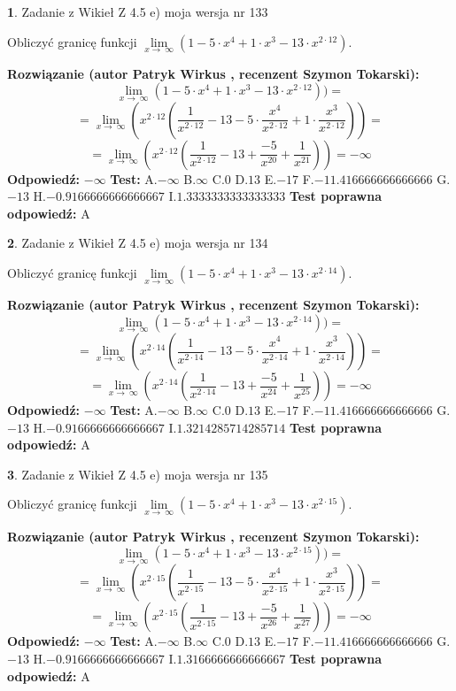 \documentclass[12pt, a4paper]{article}
\theoremstyle{definition} %
\newtheorem{zad}{}
\newcommand{\zadStart}[1]{\begin{zad}#1\newline}
\newcommand{\zadStop}{\end{zad}}
\newcommand{\rozwStart}[2]{\noindent \textbf{Rozwiązanie (autor #1 , recenzent #2): }\newline}
\newcommand{\rozwStop}{\newline}
\newcommand{\odpStart}{\noindent \textbf{Odpowiedź:}\newline}
\newcommand{\odpStop}{\newline}
\newcommand{\testStart}{\noindent \textbf{Test:}\newline}
\newcommand{\testStop}{\newline}
\newcommand{\kluczStart}{\noindent \textbf{Test poprawna odpowiedź:}\newline}
\newcommand{\kluczStop}{\newline}
\begin{document}
\zadStart{Zadanie z Wikieł Z 4.5 e) moja wersja nr 133}


Obliczyć granicę funkcji  $\lim\limits_{x\to\ \infty}(1 - 5 \cdot x^{4}+1 \cdot x^{3}- 13 \cdot x^{2\cdot12})$.
\zadStop
\rozwStart{Patryk Wirkus}{Szymon Tokarski}
$$\lim\limits_{x\to\ \infty}(1 - 5 \cdot x^{4}+1 \cdot x^{3}- 13 \cdot x^{2\cdot12}))=$$
$$=\lim\limits_{x\to\ \infty}(x^{2\cdot12}(\frac{1}{x^{2\cdot12}}-13 -5 \cdot \frac{x^{4}}{x^{2\cdot12}}+1 \cdot \frac{x^{3}}{x^{2\cdot12}}))=$$
$$=\lim\limits_{x\to\ \infty}(x^{2\cdot12}(\frac{1}{x^{2\cdot12}}-13 + \frac{-5}{x^{20}}+ \frac{1}{x^{21}}))=-\infty$$
\rozwStop
\odpStart
$-\infty$
\odpStop
\testStart
A.$-\infty$ B.$\infty$ C.$0$ D.$13$ E.$-17$
F.$-11.416666666666666$ G.$-13$
H.$-0.9166666666666667$
I.$1.3333333333333333$
\testStop
\kluczStart
A
\kluczStop



\zadStart{Zadanie z Wikieł Z 4.5 e) moja wersja nr 134}


Obliczyć granicę funkcji  $\lim\limits_{x\to\ \infty}(1 - 5 \cdot x^{4}+1 \cdot x^{3}- 13 \cdot x^{2\cdot14})$.
\zadStop
\rozwStart{Patryk Wirkus}{Szymon Tokarski}
$$\lim\limits_{x\to\ \infty}(1 - 5 \cdot x^{4}+1 \cdot x^{3}- 13 \cdot x^{2\cdot14}))=$$
$$=\lim\limits_{x\to\ \infty}(x^{2\cdot14}(\frac{1}{x^{2\cdot14}}-13 -5 \cdot \frac{x^{4}}{x^{2\cdot14}}+1 \cdot \frac{x^{3}}{x^{2\cdot14}}))=$$
$$=\lim\limits_{x\to\ \infty}(x^{2\cdot14}(\frac{1}{x^{2\cdot14}}-13 + \frac{-5}{x^{24}}+ \frac{1}{x^{25}}))=-\infty$$
\rozwStop
\odpStart
$-\infty$
\odpStop
\testStart
A.$-\infty$ B.$\infty$ C.$0$ D.$13$ E.$-17$
F.$-11.416666666666666$ G.$-13$
H.$-0.9166666666666667$
I.$1.3214285714285714$
\testStop
\kluczStart
A
\kluczStop



\zadStart{Zadanie z Wikieł Z 4.5 e) moja wersja nr 135}


Obliczyć granicę funkcji  $\lim\limits_{x\to\ \infty}(1 - 5 \cdot x^{4}+1 \cdot x^{3}- 13 \cdot x^{2\cdot15})$.
\zadStop
\rozwStart{Patryk Wirkus}{Szymon Tokarski}
$$\lim\limits_{x\to\ \infty}(1 - 5 \cdot x^{4}+1 \cdot x^{3}- 13 \cdot x^{2\cdot15}))=$$
$$=\lim\limits_{x\to\ \infty}(x^{2\cdot15}(\frac{1}{x^{2\cdot15}}-13 -5 \cdot \frac{x^{4}}{x^{2\cdot15}}+1 \cdot \frac{x^{3}}{x^{2\cdot15}}))=$$
$$=\lim\limits_{x\to\ \infty}(x^{2\cdot15}(\frac{1}{x^{2\cdot15}}-13 + \frac{-5}{x^{26}}+ \frac{1}{x^{27}}))=-\infty$$
\rozwStop
\odpStart
$-\infty$
\odpStop
\testStart
A.$-\infty$ B.$\infty$ C.$0$ D.$13$ E.$-17$
F.$-11.416666666666666$ G.$-13$
H.$-0.9166666666666667$
I.$1.3166666666666667$
\testStop
\kluczStart
A
\kluczStop
\end{document}

